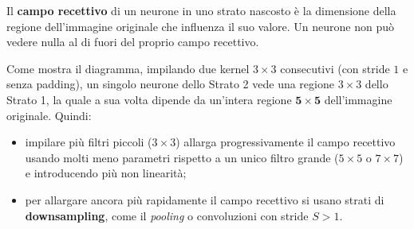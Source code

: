 \documentclass[12pt]{extarticle}
\begin{document}
\noindent Il \textbf{campo recettivo} di un neurone in uno strato nascosto è la dimensione della regione dell'immagine originale che influenza il suo valore. Un neurone non può vedere nulla al di fuori del proprio campo recettivo.

\begin{center}
\end{center}

\noindent Come mostra il diagramma, impilando due kernel $3\times 3$ consecutivi (con stride $1$ e senza padding), un singolo neurone dello Strato 2 vede una regione $3\times 3$ dello Strato 1, la quale a sua volta dipende da un'intera regione $\mathbf{5\times 5}$ dell'immagine originale. Quindi:
\begin{itemize}
    \item impilare più filtri piccoli ($3\times 3$) allarga progressivamente il campo recettivo usando molti meno parametri rispetto a un unico filtro grande ($5\times 5$ o $7\times 7$) e introducendo più non linearità;
    \item per allargare ancora più rapidamente il campo recettivo si usano strati di \textbf{downsampling}, come il \emph{pooling} o convoluzioni con stride $S>1$.
\end{itemize}
\end{document}
